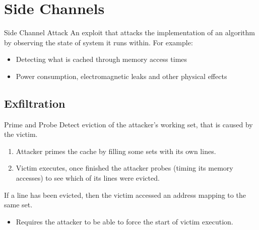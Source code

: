 \chapter{Side Channels}

\begin{definitionbox}{Side Channel Attack}
    An exploit that attacks the implementation of an algorithm by observing the state of system it runs within. For example:
    \begin{itemize}
        \item Detecting what is cached through memory access times
        \item Power consumption, electromagnetic leaks and other physical effects
    \end{itemize}
\end{definitionbox}

\section{Exfiltration}

\begin{definitionbox}{Prime and Probe}
    Detect eviction of the attacker's working set, that is caused by the victim.
    \begin{enumerate}
        \item Attacker primes the cache by filling some sets with its own lines.
        \item Victim executes, once finished the attacker probes (timing its memory accesses) to see which of its lines were evicted.
    \end{enumerate}
    If a line has been evicted, then the victim accessed an address mapping to the same set.
    \begin{itemize}
        \item Requires the attacker to be able to force the start of victim execution.
    \end{itemize}
\end{definitionbox}

